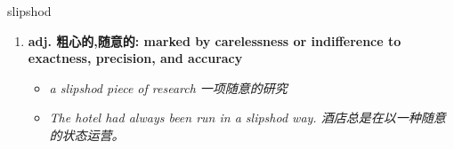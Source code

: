 
\begin{frame}
{\huge slipshod}
\begin{center}
\begin{enumerate}\Large
  \item \textbf{adj. 粗心的,随意的: marked by carelessness or indifference to exactness, precision, and accuracy}
  \begin{itemize}
    \item \em{\Large{a slipshod piece of research 一项随意的研究}}
    \item \em{\Large{The hotel had always been run in a slipshod way. 酒店总是在以一种随意的状态运营。}}
  \end{itemize}
\end{enumerate}
\end{center}
\end{frame}
